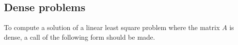 \documentclass[english,11pt]{article}
\begin{document}
















\subsection{Dense problems}

To compute a solution of a linear least square problem where the matrix $A$ is dense, a call of the following form should be made. \\
\end{document}
